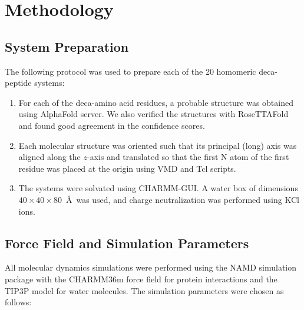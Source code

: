 \documentclass[12pt]{article}
\begin{document}
\section{Methodology}

\subsection{System Preparation}

The following protocol was used to prepare each of the 20 homomeric deca-peptide systems:

\begin{enumerate}
    \item For each of the deca-amino acid residues, a probable structure was obtained using AlphaFold server. We also verified the structures with RoseTTAFold and found good agreement in the confidence scores.
    
    \item Each molecular structure was oriented such that its principal (long) axis was aligned along the $z$-axis and translated so that the first N atom of the first residue was placed at the origin using VMD and Tcl scripts.
    
    \item The systems were solvated using CHARMM-GUI. A water box of dimensions $40 \times 40 \times 80$~\AA\ was used, and charge neutralization was performed using KCl ions.
\end{enumerate}

\subsection{Force Field and Simulation Parameters}

All molecular dynamics simulations were performed using the NAMD simulation package with the CHARMM36m force field for protein interactions and the TIP3P model for water molecules. The simulation parameters were chosen as follows:
\end{document}
